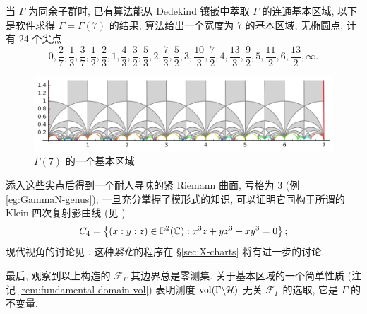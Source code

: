 \begin{example}
	当 $\Gamma$ 为同余子群时, 已有算法能从 Dedekind 镶嵌中萃取 $\Gamma$ 的连通基本区域, 以下是软件求得 $\Gamma = \Gamma(7)$ 的结果, 算法给出一个宽度为 7 的基本区域, 无椭圆点, 计有 24 个尖点
	\[ 0, \frac{2}{7}, \frac{1}{3}, \frac{3}{7}, \frac{1}{2}, \frac{2}{3}, 1, \frac{4}{3}, \frac{3}{2}, \frac{5}{3}, 2, \frac{7}{3}, \frac{5}{2}, 3, \frac{10}{3}, \frac{7}{2}, 4, \frac{13}{3}, \frac{9}{2}, 5, \frac{11}{2}, 6, \frac{13}{2}, \infty. \]

	\begin{figure}[h]
		\centering
		\includegraphics[width=\textwidth]{X7.png}
		\caption{$\Gamma(7)$ 的一个基本区域}
	\end{figure}
	添入这些尖点后得到一个耐人寻味的紧 Riemann 曲面, 亏格为 $3$ (例 \ref{eg:GammaN-genus}); 一旦充分掌握了模形式的知识, 可以证明它同构于所谓的 Klein 四次复射影曲线 (见 \cite[III.6]{KF1})
	\[ C_4 = \left\{ (x:y:z) \in \mathbb{P}^2(\mathbb{C}) : x^3 z + yz^3 + xy^3 = 0 \right\}; \]
	现代视角的讨论见 \cite[\S 4]{El99}. 这种\emph{紧化}的程序在 \S\ref{sec:X-charts} 将有进一步的讨论.
\end{example}

最后, 观察到以上构造的 $\mathcal{F}_\Gamma$ 其边界总是零测集. 关于基本区域的一个简单性质 (注记 \ref{rem:fundamental-domain-vol}) 表明测度 $\operatorname{vol}(\Gamma \backslash \mathcal{H})$ 无关 $\mathcal{F}_\Gamma$ 的选取, 它是 $\Gamma$ 的不变量.

